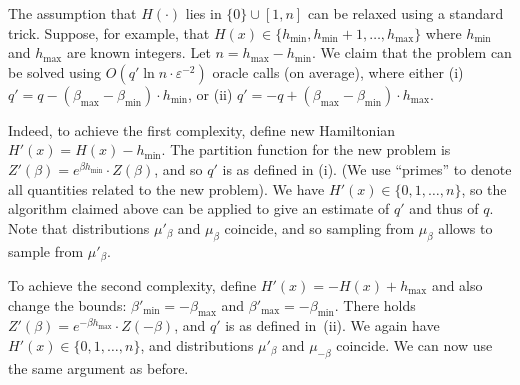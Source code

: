 \documentclass[final,12pt]{colt2018}
\def\bmin{{\beta_{\min}}}
\def\bmax{{\beta_{\max}}}
\begin{document}
\begin{remark}
The assumption that $H(\cdot)$ lies in $\{0\}\cup[1,n]$
can be relaxed using a standard trick. Suppose, for example, that $H(x)\in\{h_{\min},h_{\min}+1,\ldots,h_{\max}\}$
where $h_{\min}$ and $h_{\max}$ are known integers. Let $n=h_{\max}-h_{\min}$.
We claim that the problem can be solved using $O(q'\ln n\cdot \varepsilon^{-2})$
oracle calls (on average), where %
either (i)~$q' = q - (\bmax-\bmin)\cdot h_{\min}$,
or (ii)
$q' = -q + (\bmax-\bmin)\cdot h_{\max}$.

Indeed, to achieve the first complexity, define
new Hamiltonian $H'(x)=H(x)-h_{\min}$.
The partition function for the new problem is $Z'(\beta)=e^{\beta h_{\min}}\cdot Z(\beta)$, and so $q'$
is as defined in (i).
(We use ``primes'' to denote all quantities related to the new problem).
We have $H'(x)\in\{0,1,\ldots,n\}$, so the algorithm claimed above can be applied to give an estimate of $q'$
and thus of $q$. Note that distributions $\mu'_\beta$ and $\mu_\beta$ coincide, and so sampling from $\mu_\beta$ allows to sample from $\mu'_\beta$.

To achieve the second complexity, define $H'(x)=-H(x)+h_{\max}$ and also change the bounds: $\beta'_{\min}=-\bmax$ and 
$\beta'_{\max}=-\bmin$. There holds $Z'(\beta)=e^{-\beta h_{\max}}\cdot Z(-\beta)$, and $q'$ is as defined in~(ii).
We again have $H'(x)\in\{0,1,\ldots,n\}$, and distributions $\mu'_\beta$ and $\mu_{-\beta}$ coincide.
We can now use the same argument as before.
\end{remark}
\end{document}
